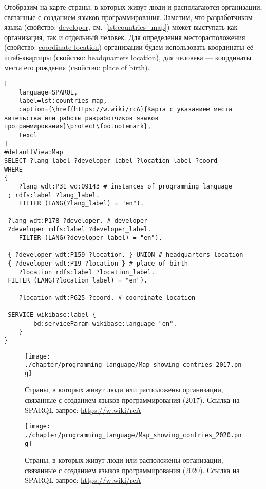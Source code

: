 Отобразим на карте страны, в которых живут люди и располагаются организации, связанные с созданием языков программирования. Заметим, что разработчиком языка (свойство: \href{https://www.wikidata.org/wiki/Property:P178}{developer}, см.~\ref{lst:countries_map}) может выступать как организация, так и отдельный человек. Для определения месторасположения (свойство: \href{https://www.wikidata.org/wiki/Property:P625}{coordinate location}) организации будем использовать координаты её штаб-квартиры (свойство: \href{https://www.wikidata.org/wiki/Property:P159}{headquarters location}), для человека --- координаты места его рождения (свойство: \href{https://www.wikidata.org/wiki/Property:P19}{place of birth}).

\begin{lstlisting}[
	language=SPARQL,
	label=lst:countries_map,
	caption={\href{https://w.wiki/rcA}{Карта с указанием места жительства или работы разработчиков языков программирования}\protect\footnotemark},
	texcl
]
#defaultView:Map
SELECT ?lang_label ?developer_label ?location_label ?coord
WHERE
{
 	?lang wdt:P31 wd:Q9143 # instances of programming language
 ; rdfs:label ?lang_label. 
 	FILTER (LANG(?lang_label) = "en"). 
 
 ?lang wdt:P178 ?developer. # developer
 ?developer rdfs:label ?developer_label. 
 	FILTER (LANG(?developer_label) = "en"). 
 		
 { ?developer wdt:P159 ?location. } UNION # headquarters location
 { ?developer wdt:P19 ?location } # place of birth
 	?location rdfs:label ?location_label. 
 FILTER (LANG(?location_label) = "en").
 
 	?location wdt:P625 ?coord. # coordinate location

 SERVICE wikibase:label {
		bd:serviceParam wikibase:language "en".
	} 	
}
\end{lstlisting}

\begin{figure}[h]
\centering
	\texttt{[image: ./chapter/programming\_language/Map\_showing\_contries\_2017.png]}
	\caption{Страны, в которых живут люди или расположены организации, связанные с созданием языков программирования (2017). Ссылка на SPARQL-запрос: \href{https://w.wiki/rcA}{https://w.wiki/rcA}}
	\label{fig:countries_2017}
\end{figure}
\begin{figure}
\centering
	\texttt{[image: ./chapter/programming\_language/Map\_showing\_contries\_2020.png]}
	\caption{Страны, в которых живут люди или расположены организации, связанные с созданием языков программирования (2020). Ссылка на SPARQL-запрос: \href{https://w.wiki/rcA}{https://w.wiki/rcA}}
	\label{fig:countries_2020}
\end{figure}

